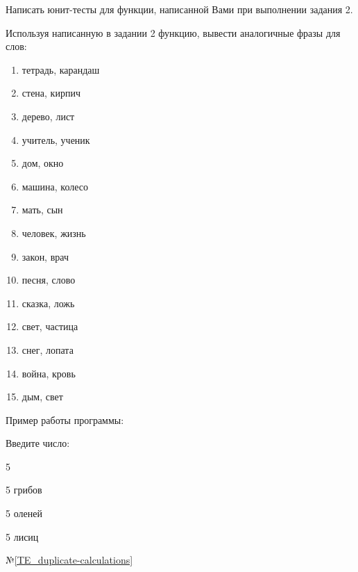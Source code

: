 \labtask

Написать юнит-тесты для функции, написанной Вами при выполнении задания 2.

\labtask

Используя написанную в задании 2 функцию, вывести аналогичные фразы для слов:

\begin{enumerate}

\item 	тетрадь, карандаш

\item 	стена, кирпич

\item 	дерево, лист

\item 	учитель, ученик

\item 	дом, окно

\item 	машина, колесо

\item 	мать, сын

\item 	человек, жизнь

\item 	закон, врач

\item 	песня, слово

\item 	сказка, ложь

\item 	свет, частица

\item 	снег, лопата

\item 	война, кровь

\item 	дым, свет


\end{enumerate}

Пример работы программы:

Введите число:

5

5 грибов

5 оленей

5 лисиц

\typerrors
№\ref{TE_duplicate-calculations}


